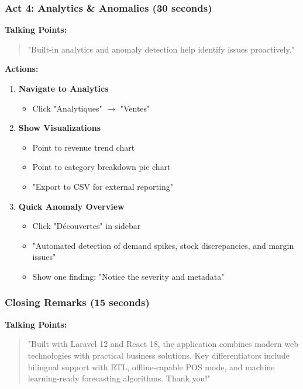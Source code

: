 \subsubsection{Act 4: Analytics \& Anomalies (30 seconds)}

\textbf{Talking Points:}

\begin{quote}
"Built-in analytics and anomaly detection help identify issues proactively."
\end{quote}

\textbf{Actions:}

\begin{enumerate}
    \item \textbf{Navigate to Analytics}
    \begin{itemize}
        \item Click "Analytiques" $\rightarrow$ "Ventes"
    \end{itemize}
    
    \item \textbf{Show Visualizations}
    \begin{itemize}
        \item Point to revenue trend chart
        \item Point to category breakdown pie chart
        \item "Export to CSV for external reporting"
    \end{itemize}
    
    \item \textbf{Quick Anomaly Overview}
    \begin{itemize}
        \item Click "Découvertes" in sidebar
        \item "Automated detection of demand spikes, stock discrepancies, and margin issues"
        \item Show one finding: "Notice the severity and metadata"
    \end{itemize}
\end{enumerate}

\subsubsection{Closing Remarks (15 seconds)}

\textbf{Talking Points:}

\begin{quote}
"Built with Laravel 12 and React 18, the application combines modern web technologies with practical business solutions. Key differentiators include bilingual support with RTL, offline-capable POS mode, and machine learning-ready forecasting algorithms. Thank you!"
\end{quote}

